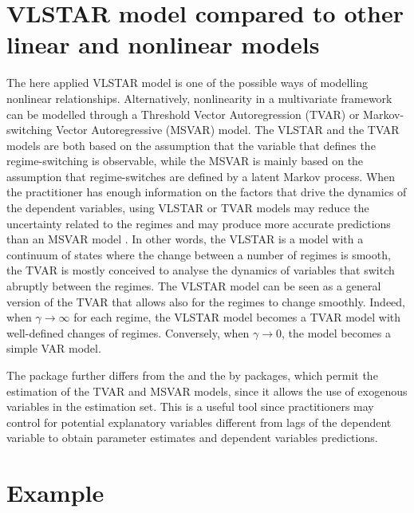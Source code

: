 \section{VLSTAR model compared to other linear and nonlinear models}
The here applied VLSTAR model is one of the possible ways of modelling nonlinear relationships. Alternatively, nonlinearity in a multivariate framework can be modelled through a Threshold Vector Autoregression (TVAR) or Markov-switching Vector Autoregressive (MSVAR) model. The VLSTAR and the TVAR models are both based on the assumption that the variable that defines the regime-switching is observable, while the MSVAR is mainly based on the assumption that regime-switches are defined by a latent Markov process. When the practitioner has enough information on the factors that drive the dynamics of the dependent variables, using VLSTAR or TVAR models may reduce the uncertainty related to the regimes and may produce more accurate predictions than an MSVAR model \cite[see][]{hute13}. In other words, the VLSTAR is a model with a continuum of states where the change between a number of regimes is smooth, the TVAR is mostly conceived to analyse the dynamics of variables that switch abruptly between the regimes. The VLSTAR model can be seen as a general version of the TVAR that allows also for the regimes to change smoothly. Indeed, when $\gamma \rightarrow \infty$ for each regime, the VLSTAR model becomes a TVAR model with well-defined changes of regimes. Conversely, when $\gamma \rightarrow 0$, the model becomes a simple VAR model.
	
The  package further differs from the  and the  by \cite{MSBVAR} packages, which permit the estimation of the TVAR and MSVAR models, since it allows the use of exogenous variables in the estimation set. This is a useful tool since practitioners may control for potential explanatory variables different from lags of the dependent variable to obtain parameter estimates and dependent variables predictions.




\section{Example} \label{Section4}


